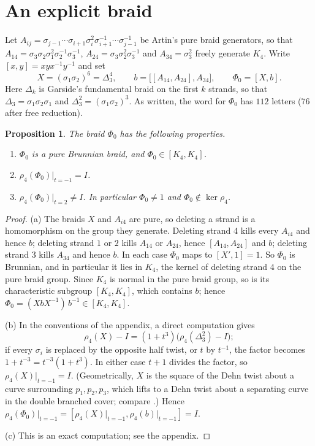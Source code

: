 \documentclass[11pt]{amsart}
\newtheorem{proposition}[lemma]{Proposition}
\theoremstyle{remark}
\newcommand{\at}{\big|_{t=-1}}
\begin{document}
\section{An explicit braid}

Let $A_{ij}=\sigma_{j-1}\cdots\sigma_{i+1}\sigma_i^2\sigma_{i+1}^{-1}\cdots\sigma_{j-1}^{-1}$ be Artin's pure braid generators, so that $A_{14}=\sigma_3\sigma_2\sigma_1^2\sigma_2^{-1}\sigma_3^{-1}$, $A_{24}=\sigma_3\sigma_2^2\sigma_3^{-1}$ and $A_{34}=\sigma_3^2$ freely generate $K_4$. Write $[x,y]=xyx^{-1}y^{-1}$ and set
\[
X=(\sigma_1\sigma_2)^6=\Delta_3^4,\qquad b=\bigl[[A_{14},A_{24}],A_{34}\bigr],\qquad \Phi_0=[X,b].
\]
Here $\Delta_k$ is Garside's fundamental braid on the first $k$ strands, so that $\Delta_3=\sigma_1\sigma_2\sigma_1$ and $\Delta_3^2=(\sigma_1\sigma_2)^3$. As written, the word for $\Phi_0$ has $112$ letters ($76$ after free reduction).

\begin{proposition}\label{prop:phi0}
The braid $\Phi_0$ has the following properties.
\begin{enumerate}
\item[(a)] $\Phi_0$ is a pure Brunnian braid, and $\Phi_0\in[K_4,K_4]$.
\item[(b)] $\rho_4(\Phi_0)\at=I$.
\item[(c)] $\rho_4(\Phi_0)|_{t=2}\neq I$. In particular $\Phi_0\neq1$ and $\Phi_0\notin\ker\rho_4$.
\end{enumerate}
\end{proposition}

\begin{proof}
(a) The braids $X$ and $A_{i4}$ are pure, so deleting a strand is a homomorphism on the group they generate. Deleting strand $4$ kills every $A_{i4}$ and hence $b$; deleting strand $1$ or $2$ kills $A_{14}$ or $A_{24}$, hence $[A_{14},A_{24}]$ and $b$; deleting strand $3$ kills $A_{34}$ and hence $b$. In each case $\Phi_0$ maps to $[X',1]=1$. So $\Phi_0$ is Brunnian, and in particular it lies in $K_4$, the kernel of deleting strand $4$ on the pure braid group. Since $K_4$ is normal in the pure braid group, so is its characteristic subgroup $[K_4,K_4]$, which contains $b$; hence $\Phi_0=(XbX^{-1})\,b^{-1}\in[K_4,K_4]$.

(b) In the conventions of the appendix, a direct computation gives
\[
\rho_4(X)-I=(1+t^3)\bigl(\rho_4(\Delta_3^2)-I\bigr);
\]
if every $\sigma_i$ is replaced by the opposite half twist, or $t$ by $t^{-1}$, the factor becomes $1+t^{-3}=t^{-3}(1+t^3)$. In either case $t+1$ divides the factor, so $\rho_4(X)\at=I$. (Geometrically, $X$ is the square of the Dehn twist about a curve surrounding $p_1,p_2,p_3$, which lifts to a Dehn twist about a separating curve in the double branched cover; compare \cite{BMP}.) Hence $\rho_4(\Phi_0)\at=[\rho_4(X)\at,\rho_4(b)\at]=I$.

(c) This is an exact computation; see the appendix.
\end{proof}
\end{document}
